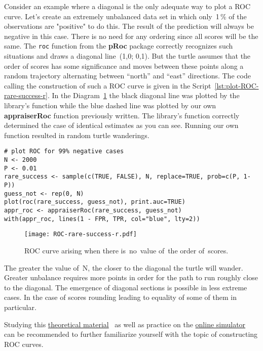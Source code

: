 \documentclass[]{scrreprt}
\begin{document}
Consider an example where a diagonal is the only adequate way to plot a ROC curve. Let's create an extremely unbalanced data set in which only~1\,\% of the observations are "positive" to do this. The result of the prediction will always be negative in this case. There is no need for any ordering since all scores will be the same. The \texttt{roc} function from the \textbf{pRoc} package correctly recognizes such situations and draws a diagonal line~(1,0; 0,1). But the turtle assumes that the order of scores has some significance and moves between these points along a random trajectory alternating between ``north'' and ``east'' directions. The code calling the construction of such a ROC curve is given in the Script~\ref{lst:plot-ROC-rare-success-r}. In the Diagram~\ref{fig:ROC-rare-success-r} the black diagonal line was plotted by the library's function while the blue dashed line was plotted by our own \textbf{appraiserRoc} function previously written. The library's function correctly determined the case of identical estimates as you can see. Running our own function resulted in random turtle wanderings.
%
\begin{lstlisting}[float=htp, caption = Plotting the ROC curve in~case of~absence of~order of~scores, firstnumber=1, label= lst:plot-ROC-rare-success-r]
# plot ROC for 99% negative cases
N <- 2000
P <- 0.01
rare_success <- sample(c(TRUE, FALSE), N, replace=TRUE, prob=c(P, 1-P))
guess_not <- rep(0, N)
plot(roc(rare_success, guess_not), print.auc=TRUE)
appr_roc <- appraiserRoc(rare_success, guess_not)
with(appr_roc, lines(1 - FPR, TPR, col="blue", lty=2))
\end{lstlisting}
%
\begin{figure}[htp]
	\centering
	\texttt{[image: ROC-rare-success-r.pdf]}
	\caption{ROC curve arising when there is~no~value of~the order of~scores.}
	\label{fig:ROC-rare-success-r}
\end{figure}
%

The greater the value of~N, the closer to the diagonal the turtle will wander. Greater unbalance requires more points in order for the path to run roughly close to the diagonal. The emergence of diagonal sections is possible in less extreme cases. In the case of scores rounding leading to equality of some of them in particular.

Studying this \href{https://web.tresorit.com/l/APSpC#AfkTKO5_-ijMhPuXE-qEzg}{theoretical material}~\cite{ROC-analysis} as well as practice on the \href{https://kennis-research.shinyapps.io/ROC-Curves/}{online simulator}~\cite{ROC-curve-practice} can be recommended to further familiarize yourself with the topic of constructing ROC curves.
%
\end{document}
